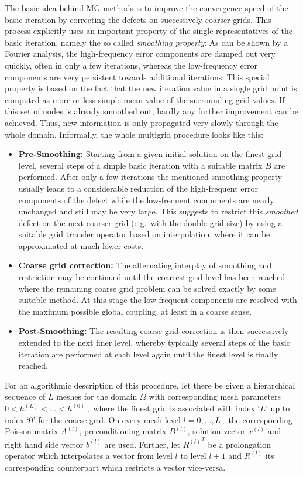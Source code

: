 \newpage
The basic idea behind MG-methods is to improve the convergence speed of the basic iteration by correcting the defects on successively coarser grids.
This process explicitly uses an important property of the single representatives of the basic iteration, namely the so called {\it smoothing property}: As can be shown by a Fourier analysis, the high-frequency error components are damped out very quickly, often in only a few iterations, whereas the low-frequency error components are very persistent towards additional iterations.
This special property is based on the fact that the new iteration value in a single grid point is computed as more or less simple mean value of the surrounding grid values. If this set of nodes is already smoothed out, hardly any further improvement can be achieved. Thus, new information is only propagated very slowly through the whole domain. Informally, the whole multigrid procedure looks like this:

\begin{itemize}
\item {\bf Pre-Smoothing:}
Starting from a given initial solution on the finest grid level, several steps of a simple basic iteration with a suitable matrix $B$ are performed. After only a few iterations 
the mentioned smoothing property usually leads to a considerable reduction of the high-frequent error components of the defect while the low-frequent components are nearly unchanged and still may be very large. 
This suggests to restrict this  {\it smoothed}  defect  on the next coarser grid (e.g.\ with the double grid size) by using a suitable grid transfer operator based on interpolation, where it can be approximated at much lower costs. 
\item {\bf Coarse grid correction:} The alternating interplay of smoothing and restriction
may be continued until the coarsest grid level has been reached where the remaining coarse grid problem can be solved exactly by some suitable method. At this stage the low-frequent components are resolved with the maximum possible global coupling, at least in a coarse sense. 
\item {\bf Post-Smoothing:} The resulting coarse grid correction is then successively extended to the next finer level, whereby typically several steps of the basic iteration are performed at each level again until the finest level is finally reached.
\end{itemize}


For an algorithmic description of this procedure, 
let there be given a hierarchical sequence of $L$ meshes for the domain $\Omega$
with corresponding mesh parameters $0<h^{(L)}< \ldots < h^{(0)}\,,$
where the finest grid is associated with index `$L$' up to index `0' for the coarse grid. On every mesh level 
$l=0, \ldots,L\,,$ the
corresponding Poisson matrix $A^{(l)}$, preconditioning matrix $B^{(l)}$, solution vector $x^{(l)}$ and right hand side vector $b^{(l)}$ are
used.
Further, let ${R^{(l)}}^T$ be a prolongation operator which interpolates a vector from level $l$ to level $l+1$ and
$R^{(l)}$ its corresponding counterpart which restricts a vector vice-versa.


